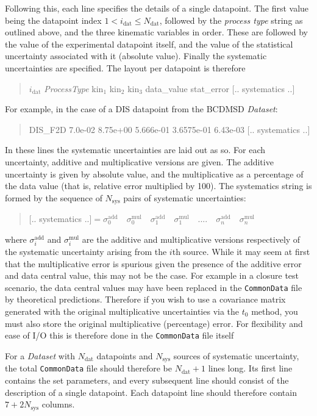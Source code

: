 \documentclass[11pt]{article}
\begin{document}
Following this, each line specifies the details of a single datapoint. The first value being the datapoint index $1< i_{\text{dat}} \leq N_{\mathrm{dat}}$, followed by the \emph{process type} string as outlined above, and the three kinematic variables in order. These are followed by the value of the experimental datapoint itself, and the value of the statistical uncertainty associated with it (absolute value). Finally the systematic uncertainties are specified. The layout per datapoint is therefore
\begin{quotation}\noindent
$i_{\mathrm{dat}}$   \emph{ProcessType} kin$_1$ kin$_2$ kin$_3$ data\_value stat\_error  $[..$ systematics $..]$ 
\end{quotation}
For example, in the case of a DIS datapoint from the BCDMSD \emph{Dataset}:
\begin{quotation}    DIS\_F2D 7.0e-02   8.75e+00   5.666e-01   3.6575e-01   6.43e-03 $[..$ systematics $..]$ 
\end{quotation}
In these lines the systematic uncertainties are laid out as so. For each uncertainty, additive and multiplicative versions are given. The additive uncertainty is given by absolute value, and the multiplicative as a percentage of the data value (that is, relative error multiplied by 100). The systematics string is formed by the sequence of $N_{\text{sys}}$ pairs of systematic uncertainties:
\begin{quotation}\noindent
$[..$ systematics $..] =  \sigma^{\mathrm{add}}_0 \quad  \sigma^{\mathrm{mul}}_0\quad \sigma^{\mathrm{add}}_1 \quad \sigma^{\mathrm{mul}}_1 \quad....\quad \sigma^{\mathrm{add}}_n  \quad\sigma^{\mathrm{mul}}_n$
\end{quotation}
where $\sigma^{\mathrm{add}}_i$ and $\sigma^{\mathrm{mul}}_i$ are the additive and multiplicative versions respectively of the systematic uncertainty arising from the $i$th source. While it may seem at first that the multiplicative error is spurious given the presence of the additive error and data central value, this may not be the case. For example in a closure test scenario, the data central values may have been replaced in the {\tt CommonData} file by theoretical predictions. Therefore if you wish to use a covariance matrix generated with the original multiplicative uncertainties via the $t_0$ method, you must also store the original multiplicative (percentage) error. For flexibility and ease of I/O this is therefore done in the {\tt CommonData} file itself

For a \emph{Dataset} with $N_{\text{dat}}$ datapoints and $N_{\text{sys}}$ sources of systematic uncertainty, the total {\tt CommonData} file should therefore be $N_{\text{dat}}+1$ lines long. Its first line contains the set parameters, and every subsequent line should consist of the description of a single datapoint. Each datapoint line should therefore contain $7 + 2N_{\text{sys}}$ columns.
\end{document}
